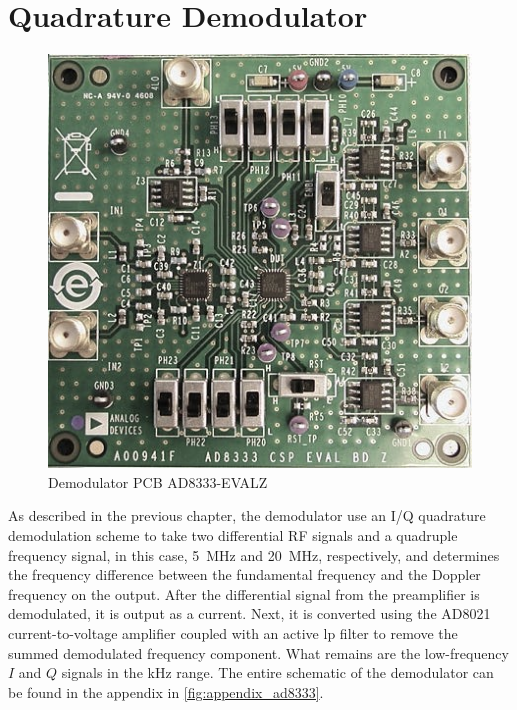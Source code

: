 \section{Quadrature Demodulator} \label{sec:implementation_demodulator}
\begin{figure}[htbp]
	\centering
	\includegraphics[width=.8\textwidth]{Figures/4_demod_pcb_pic.jpg}
	\caption{Demodulator PCB AD8333-EVALZ}
	\label{fig:4_demod_pcb_pic}
\end{figure}
As described in the previous chapter, the demodulator use an I/Q quadrature demodulation scheme to take two differential RF signals and a quadruple frequency signal, in this case, \qty{5}{\mega\hertz} and \qty{20}{\mega\hertz}, respectively, and determines the frequency difference between the fundamental frequency and the Doppler frequency on the output. After the differential signal from the preamplifier is demodulated, it is output as a current. Next, it is converted using the AD8021 current-to-voltage amplifier coupled with an active \gls{lp} filter to remove the summed demodulated frequency component. What remains are the low-frequency $I$ and $Q$ signals in the \unit{\kilo\hertz} range. The entire schematic of the demodulator can be found in the appendix in \cref{fig:appendix_ad8333}.

